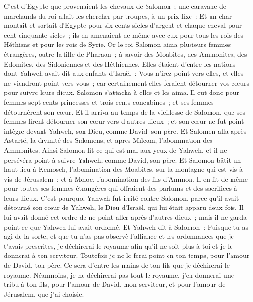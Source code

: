 \begin{multicols}{2}
C'est d'Egypte que provenaient les chevaux de Salomon~; une caravane de marchands du roi allait les chercher par troupes, à un prix fixe~:
Et un char montait et sortait d'Egypte pour six cents sicles d'argent et chaque cheval pour cent cinquante sicles~; ils en amenaient de même avec eux pour tous les rois des Héthiens et pour les rois de Syrie.
\VerseOne{}Or le roi Salomon aima plusieurs femmes étrangères, outre la fille de Pharaon~; à savoir des Moabites, des Ammonites, des Edomites, des Sidoniennes et des Héthiennes.
Elles étaient d'entre les nations dont Yahweh avait dit aux enfants d'Israël~: Vous n'irez point vers elles, et elles ne viendront point vers vous~; car certainement elles feraient détourner vos cœurs pour suivre leurs dieux. Salomon s'attacha à elles et les aima.
Il eut donc pour femmes sept cents princesses et trois cents concubines~; et ses femmes détournèrent son cœur.
Et il arriva au temps de la vieillesse de Salomon, que ses femmes firent détourner son cœur vers d'autres dieux~; et son cœur ne fut point intègre devant Yahweh, son Dieu, comme David, son père.
Et Salomon alla après Astarté, la divinité des Sidoniens, et après Milcom, l'abomination des Ammonites.
Ainsi Salomon fit ce qui est mal aux yeux de Yahweh, et il ne persévéra point à suivre Yahweh, comme David, son père.
Et Salomon bâtit un haut lieu à Kemosch, l'abomination des Moabites, sur la montagne qui est vis-à-vis de Jérusalem~; et à Moloc, l'abomination des fils d'Ammon.
Il en fit de même pour toutes ses femmes étrangères qui offraient des parfums et des sacrifices à leurs dieux.
C'est pourquoi Yahweh fut irrité contre Salomon, parce qu'il avait détourné son cœur de Yahweh, le Dieu d'Israël, qui lui était apparu deux fois.
Il lui avait donné cet ordre de ne point aller après d'autres dieux~; mais il ne garda point ce que Yahweh lui avait ordonné.
Et Yahweh dit à Salomon~: Puisque tu as agi de la sorte, et que tu n'as pas observé l'alliance et les ordonnances que je t'avais prescrites, je déchirerai le royaume afin qu'il ne soit plus à toi et je le donnerai à ton serviteur.
Toutefois je ne le ferai point en ton temps, pour l'amour de David, ton père. Ce sera d'entre les mains de ton fils que je déchirerai le royaume.
Néanmoins, je ne déchirerai pas tout le royaume, j'en donnerai une tribu à ton fils, pour l'amour de David, mon serviteur, et pour l'amour de Jérusalem, que j'ai choisie.

\end{multicols}

